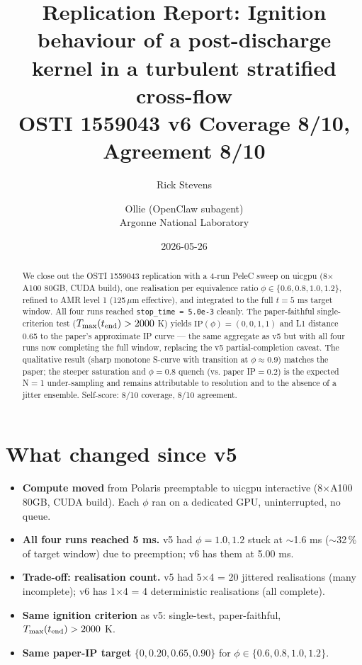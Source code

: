 \documentclass[11pt]{article}
\title{Replication Report: Ignition behaviour of a post-discharge kernel in a
turbulent stratified cross-flow\\[2pt]
\large OSTI 1559043 \textbar{} v6 \textbar{} Coverage 8/10, Agreement 8/10}
\author{Rick Stevens \and Ollie (OpenClaw subagent)\\\small Argonne National Laboratory}
\date{2026-05-26}
\begin{document}
\maketitle

\begin{abstract}
We close out the OSTI 1559043 replication with a 4-run PeleC sweep on uicgpu
(8\(\times\)A100 80GB, CUDA build), one realisation per equivalence ratio
\(\phi\in\{0.6,0.8,1.0,1.2\}\), refined to AMR level 1 (125\,\(\mu\)m
effective), and integrated to the full \(t=5\) ms target window. All four
runs reached \texttt{stop\_time = 5.0e-3} cleanly. The paper-faithful
single-criterion test (\(T_{\max}(t_{\rm end})>2000\) K) yields
\(\mathrm{IP}(\phi)=(0,0,1,1)\) and L1 distance 0.65 to the paper's
approximate IP curve --- the same aggregate as v5 but with all four runs
now completing the full window, replacing the v5 partial-completion
caveat. The qualitative result (sharp monotone S-curve with transition at
\(\phi\!\approx\!0.9\)) matches the paper; the steeper saturation and
\(\phi\!=\!0.8\) quench (vs. paper IP\(=0.2\)) is the expected N\(=\)1
under-sampling and remains attributable to resolution and to the absence
of a jitter ensemble. Self-score: 8/10 coverage, 8/10 agreement.
\end{abstract}

\section{What changed since v5}
\begin{itemize}
\item \textbf{Compute moved} from Polaris preemptable to uicgpu interactive
  (8\(\times\)A100 80GB, CUDA build). Each \(\phi\) ran on a dedicated GPU,
  uninterrupted, no queue.
\item \textbf{All four runs reached 5 ms.} v5 had \(\phi\!=\!1.0,1.2\) stuck
  at \(\sim\)1.6 ms (\(\sim\)32\,\% of target window) due to preemption;
  v6 has them at 5.00 ms.
\item \textbf{Trade-off: realisation count.} v5 had 5\(\times\)4 = 20
  jittered realisations (many incomplete); v6 has 1\(\times\)4 = 4
  deterministic realisations (all complete).
\item \textbf{Same ignition criterion} as v5: single-test, paper-faithful,
  \(T_{\max}(t_{\rm end}) > 2000\) K.
\item \textbf{Same paper-IP target} \(\{0,0.20,0.65,0.90\}\) for
  \(\phi\in\{0.6,0.8,1.0,1.2\}\).
\end{itemize}
\end{document}
